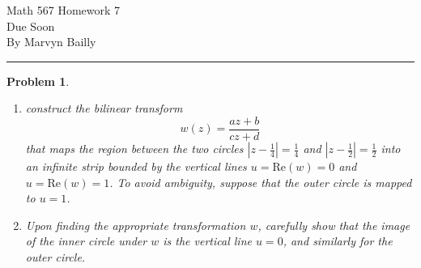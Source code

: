 \documentclass[12pt]{report}
\newtheorem{problem}{Problem}
\begin{document}
\large

\begin{center}
 Math 567 Homework 7\\
 Due Soon\\
 By Marvyn Bailly\\
\end{center}

\normalsize

\hrule



\begin{problem}
    \begin{enumerate}

        \noindent
        \item[a] construct the bilinear transform
        \[ w(z) = \frac{az + b}{cz + d}\]
        that maps the region between the two circles $| z - \frac{1}{4} | = \frac{1}{4}$ and $| z - \frac{1}{2} | = \frac{1}{2}$ into an infinite strip bounded by the vertical lines $u = \mathrm{Re}(w) = 0$ and $u = \mathrm{Re}(w) = 1$. To avoid ambiguity, suppose that the outer circle is mapped to $u = 1$.

        \item[b] Upon finding the appropriate transformation $w$, carefully show that the image of the inner circle under $w$ is the vertical line $u = 0$, and similarly for the outer circle.
    \end{enumerate}
\end{problem}
\end{document}

